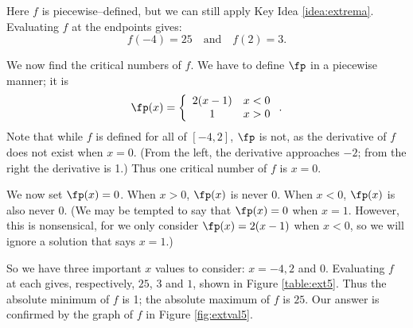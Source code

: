 {Here $f$ is piecewise--defined, but we can still apply Key Idea \ref{idea:extrema}. Evaluating $f$ at the endpoints gives: 
$$ f(-4) = 25 \quad \text{and} \quad f(2) = 3.$$

We now find the critical numbers of $f$. We have to define $\fp$ in a piecewise manner; it is $$\fp(x) =\left\{\begin{array}{cc} 2(x-1) & x < 0 \\ 1 & x>0 \end{array}\right. .$$ Note that while $f$ is defined for all of $[-4,2]$, $\fp$ is not, as the derivative of $f$ does not exist when $x=0$. (From the left, the derivative approaches $-2$; from the right the derivative is 1.) Thus one critical number of $f$ is $x=0$.

We now set $\fp(x) = 0$. When $x >0$, $\fp(x)$ is never 0.  When $x<0$, $\fp(x)$ is also never 0. (We may be tempted to say that $\fp(x) = 0 $ when $x=1$. However, this is nonsensical, for we only consider $\fp(x) = 2(x-1)$ when $x<0$, so we will ignore a solution that says $x=1$.) 

So we have three important $x$ values to consider: $x= -4, 2$ and $0$. Evaluating $f$ at each gives, respectively, $25$, $3$ and $1$, shown in Figure \ref{table:ext5}. Thus the absolute minimum of $f$ is 1; the absolute maximum of $f$ is $25$. Our answer is confirmed by the graph of $f$ in Figure \ref{fig:extval5}.
}\\
\pagebreak

